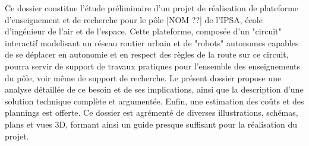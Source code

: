 Ce dossier constitue l'étude préliminaire d'un projet de réalisation de plateforme d'enseignement et de recherche pour le pôle [NOM ??] de l'IPSA, école d'ingénieur de l'air et de l'espace.
Cette plateforme, composée d'un "circuit" interactif modelisant un réseau routier urbain et de "robots" autonomes capables de se déplacer en autonomie et en respect des règles de la route sur ce circuit, pourra servir de support de travaux pratiques pour l'ensemble des enseignements du pôle, voir même de support de recherche.
Le présent dossier propose une analyse détaillée de ce besoin et de ses implications, ainsi que la description d'une solution technique complète et argumentée. Enfin, une estimation des coûts et des plannings est offerte.
Ce dossier est agrémenté de diverses illustrations, schémas, plans et vues 3D, formant ainsi un guide presque suffisant pour la réalisation du projet.